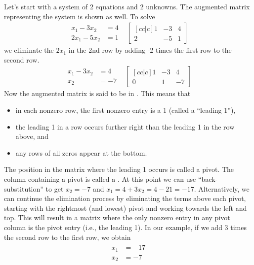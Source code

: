 \begin{example}
Let's start with a system of 2 equations and 2 unknowns. The augmented
matrix representing the system is shown as well. To solve $$
\begin{array}{rr}
\begin{array}{rl}
x_1-3x_2&=4\\
2x_1-5x_2&=1 
\end{array}
&
\begin{bmatrix}[cc|c] 1&-3&4\\2&-5&1
\end{bmatrix} 
\end{array}
$$
we eliminate the $2x_1$ in the 2nd row by adding -2 times the first row to the second row.
$$\begin{array}{rr}
\begin{array}{rl}
x_1-3x_2&=4\\
x_2&=-7 
\end{array}
&
\begin{bmatrix}[cc|c] 1&-3&4\\0&1&-7
\end{bmatrix} 
\end{array}
$$
Now the augmented matrix is said to be in . This means that 
\begin{itemize}
	\item in each nonzero row, the first nonzero entry is a 1 (called a ``leading 1''),
  \item the leading 1 in a row occurs further right than the leading 1 in the row above, and
  \item any rows of all zeros appear at the bottom.
\end{itemize}
The position in the matrix where the leading 1 occurs is called a pivot. 
The column containing a pivot is called a . 
At this point we can use ``back-substitution'' to get {$x_2=-7$} and {$x_1=4+3x_2 = 4-21=-17$}. 
Alternatively, we can continue the elimination process by eliminating
the terms above each pivot, starting with the rightmost (and lowest) pivot and
working towards the left and top.
This will result in a matrix where the only nonzero entry in any pivot column is the pivot entry (i.e., the leading 1). 
In our example, if we add 3 times the second row to the first row, we obtain
$$\begin{array}{rr}
\begin{array}{rl}
x_1&=-17\\
x_2&=-7 
\end{array}

\end{array}$$
\end{example}
